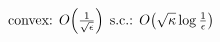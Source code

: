 \documentclass[preview]{standalone}
\begin{document}
\begin{align*}
\special{dvisvgm:raw <g id='unique000'>}\text{convex: } O\!\left(\tfrac{1}{\sqrt{\epsilon}}\right)\;\text{s.c.: } O\!\left(\sqrt{\kappa}\log\tfrac{1}{\epsilon}\right)\special{dvisvgm:raw </g>}
\end{align*}
\end{document}
